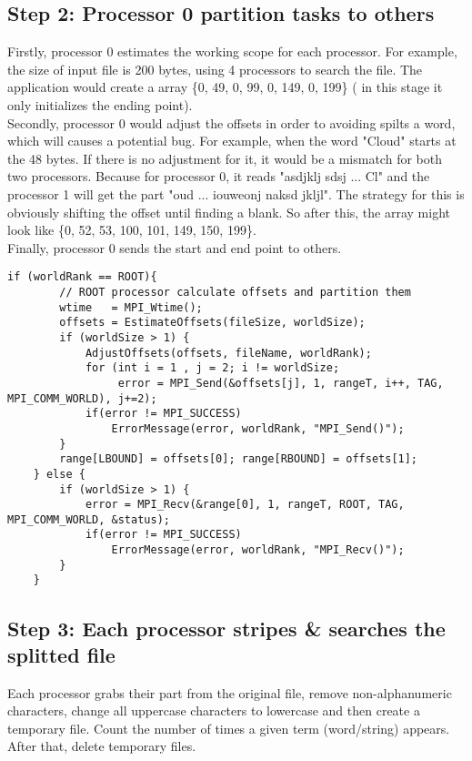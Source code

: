 \documentclass[a4paper,12pt]{article}
\theoremstyle{mytheor}
\begin{document}
\subsection*{Step 2: Processor 0 partition tasks to others}
Firstly, processor 0 estimates the working scope for each processor. For example, the size of input file is 200 bytes, using 4 processors to search the file. The application would create a array \{0, 49, 0, 99, 0, 149, 0, 199\} ( in this stage it only initializes the ending point).\\
Secondly, processor 0 would adjust the offsets in order to avoiding spilts a word, which will causes a potential bug. For example, when the word "Cloud" starts at the 48 bytes. If there is no adjustment for it, it would be a mismatch for both two processors. Because for processor 0, it reads "asdjklj sdsj ... Cl" and the processor 1 will get the part "oud ... iouweonj naksd jkljl". The strategy for this is obviously shifting the offset until finding a blank. So after this, the array might look like \{0, 52, 53, 100, 101, 149, 150, 199\}.\\
Finally, processor 0 sends the start and end point to others.

\begin{lstlisting}[label={list:second},caption=Processor 0 record the start time \& partition the task to other processors.]
	if (worldRank == ROOT){
        // ROOT processor calculate offsets and partition them
		wtime	= MPI_Wtime();
		offsets = EstimateOffsets(fileSize, worldSize);
		if (worldSize > 1) {
			AdjustOffsets(offsets, fileName, worldRank);
			for (int i = 1 , j = 2; i != worldSize;
				 error = MPI_Send(&offsets[j], 1, rangeT, i++, TAG, MPI_COMM_WORLD), j+=2);
			if(error != MPI_SUCCESS)
				ErrorMessage(error, worldRank, "MPI_Send()");
		}
		range[LBOUND] = offsets[0]; range[RBOUND] = offsets[1];
	} else {
		if (worldSize > 1) {
			error = MPI_Recv(&range[0], 1, rangeT, ROOT, TAG, MPI_COMM_WORLD, &status);
			if(error != MPI_SUCCESS)
				ErrorMessage(error, worldRank, "MPI_Recv()");
		}
	}

\end{lstlisting}

\subsection*{Step 3: Each processor stripes \& searches the splitted file}
Each processor grabs their part from the original file, remove non-alphanumeric characters, change all uppercase characters to lowercase and then create a temporary file. Count the number of times a given term (word/string) appears. After that, delete temporary files.
\end{document}

